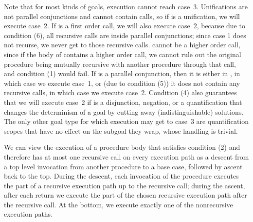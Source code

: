 
Note that for most kinds of goals, execution cannot reach case~3.
Unifications are not parallel conjunctions and cannot contain calls,
so if  is a unification, we will execute case~2.
If  is a first order call, we will also execute case~2,
because due to condition (6),
all recursive calls are inside parallel conjunctions;
since case 1 does not recurse,
we never get to those recursive calls.
 cannot be a higher order call,
since if the body of  contains a higher order call,
we cannot rule out the original procedure
being mutually recursive with another procedure through that call,
and condition (1) would fail.
If  is a parallel conjunction,
then it is either in ,
in which case we execute case~1,
or (due to condition (5))
it does not contain any recursive calls,
in which case we execute case~2.
Condition (4) also guarantees that we will execute case~2
if  is a disjunction, negation,
or a quantification that changes the determinism of a goal
by cutting away (indistinguishable) solutions.
The only other goal type for which execution may get to case~3
are quantification scopes that have no effect on the subgoal they wrap,
whose handling is trivial.

We can view the execution of a procedure body that satisfies condition (2)
and therefore has at most one recursive call on every execution path
as a descent from a top level invocation from another procedure
to a base case, followed by ascent back to the top.
During the descent,
each invocation of the procedure executes
the part of a recursive execution path
up to the recursive call;
during the ascent,
after each return we execute
the part of the chosen recursive execution path after the recursive call.
At the bottom, we execute exactly one of the nonrecursive execution paths.

